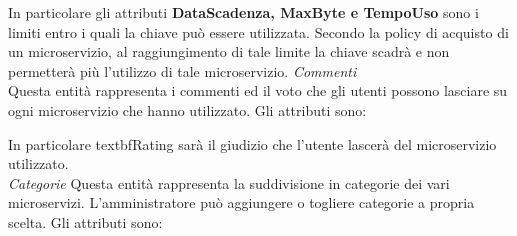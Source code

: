 {{			\begin{center}
			\begin{table}[H]\caption{Entità Key}
			\label{EK}
			\end{table}
			\end{center}
			In particolare gli attributi \textbf{DataScadenza, MaxByte e TempoUso} sono i limiti entro i quali la chiave può essere utilizzata. Secondo la policy di acquisto di un microservizio, al raggiungimento di tale limite la chiave scadrà e non permetterà più l'utilizzo di tale microservizio.
			\textit{Commenti}\\
			Questa entità rappresenta i commenti ed il voto  che gli utenti possono lasciare su ogni microservizio che hanno utilizzato. Gli attributi sono:
			\begin{center}
			\begin{table}[H]\caption{Entità Commenti}
			\label{EC}
			\end{table}
			\end{center}
			In particolare textbf{Rating} sarà il giudizio che l'utente lascerà del microservizio utilizzato. \\
			
			\textit{Categorie}
			Questa entità rappresenta la suddivisione in categorie dei vari microservizi. L'amministratore può aggiungere o togliere categorie a propria scelta. Gli attributi sono: 
			\begin{center}
			\begin{table}[H]\caption{Entità Categorie}
			\label{ECat}
			\end{table}
			\end{center}
			
}}
